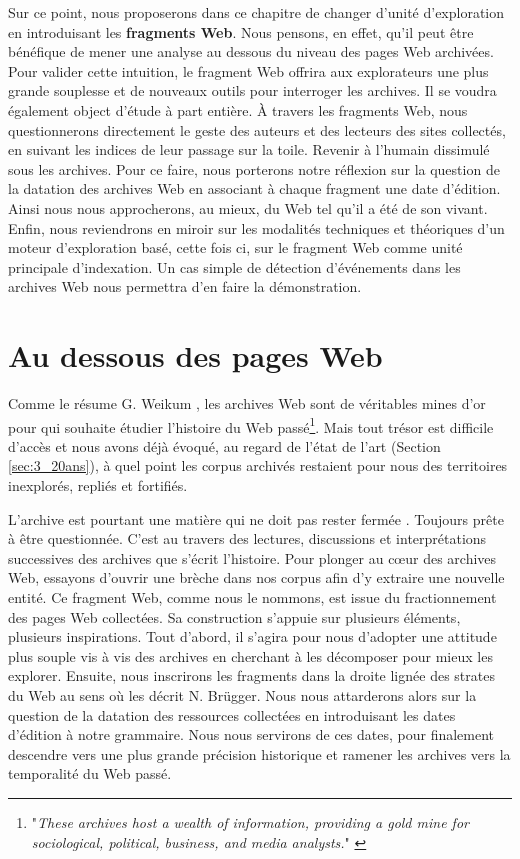 \documentclass[symmetric,justified,marginals=raggedouter]{tufte-book}
\begin{document}
Sur ce point, nous proposerons dans ce chapitre de changer d'unité d'exploration en introduisant les \textbf{fragments Web}. Nous pensons, en effet, qu'il peut être bénéfique de mener une analyse au dessous du niveau des pages Web archivées. Pour valider cette intuition, le fragment Web offrira aux explorateurs une plus grande souplesse et de nouveaux outils pour interroger les archives. Il se voudra également object d'étude à part entière. À travers les fragments Web, nous questionnerons directement le geste des auteurs et des lecteurs des sites collectés, en suivant les indices de leur passage sur la toile. Revenir à l'humain dissimulé sous les archives. Pour ce faire, nous porterons notre réflexion sur la question de la datation des archives Web en associant à chaque fragment une date d'édition. Ainsi nous nous approcherons, au mieux, du Web tel qu'il a été de son vivant. Enfin, nous reviendrons en miroir sur les modalités techniques et théoriques d'un moteur d'exploration basé, cette fois ci, sur le fragment Web comme unité principale d'indexation. Un cas simple de détection d'événements dans les archives Web nous permettra d'en faire la démonstration.

\section{Au dessous des pages Web}
\label{sec:5_dessous}

\noindent Comme le résume G. Weikum \citep{weikum_longitudinal_2011}, les archives Web sont de véritables mines d'or pour qui souhaite étudier l'histoire du Web passé\footnote{"\textit{These archives host a wealth of information, providing a gold mine for sociological, political, business, and media analysts.}" \citep{weikum_longitudinal_2011}}. Mais tout trésor est difficile d'accès et nous avons déjà évoqué, au regard de l'état de l'art (Section \ref{sec:3_20ans}), à quel point les corpus archivés restaient pour nous des territoires inexplorés, repliés et fortifiés. 

L'archive est pourtant une matière qui ne doit pas rester fermée \citep{ketelaar_de_2006}. Toujours prête à être questionnée. C'est au travers des lectures, discussions et interprétations successives des archives que s'écrit l'histoire. Pour plonger au cœur des archives Web, essayons d'ouvrir une brèche dans nos corpus afin d'y extraire une nouvelle entité. Ce fragment Web, comme nous le nommons, est issue du fractionnement des pages Web collectées. Sa construction s'appuie sur plusieurs éléments, plusieurs inspirations. Tout d'abord, il s'agira pour nous d'adopter une attitude plus souple vis à vis des archives en cherchant à les décomposer pour mieux les explorer. Ensuite, nous inscrirons les fragments dans la droite lignée des strates du Web au sens où les décrit N. Brügger. Nous nous attarderons alors sur la question de la datation des ressources collectées en introduisant les dates d'édition à notre grammaire. Nous nous servirons de ces dates, pour finalement descendre vers une plus grande précision historique et ramener les archives vers la temporalité du Web passé.
\end{document}

